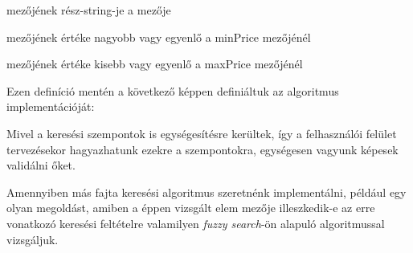  \begin{listing}
 	\item {} mezőjének rész-string-je a   mezője
 	\item {} mezőjének értéke nagyobb vagy egyenlő a  minPrice mezőjénél
 	\item {} mezőjének értéke kisebb vagy egyenlő a  maxPrice mezőjénél
 \end{listing}

Ezen definíció mentén a következő képpen definiáltuk az algoritmus implementációját: 


Mivel a keresési szempontok is egységesítésre kerültek, így a felhasználói felület tervezésekor hagyazhatunk ezekre a szempontokra, egységesen vagyunk képesek validálni őket. \par

Amennyiben más fajta keresési algoritmus szeretnénk implementálni, például egy olyan megoldást, amiben a éppen vizsgált elem  mezője illeszkedik-e az erre vonatkozó keresési feltételre valamilyen \emph{fuzzy search}-ön \cite{hall1980approximate} alapuló algoritmussal vizsgáljuk.  


